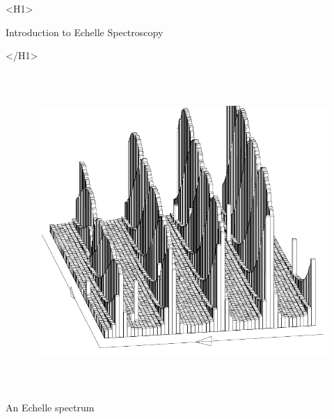 \documentclass[twoside,11pt]{article}
\newcommand{\stardoctitle}     {Introduction to Echelle Spectroscopy}
\newcommand{\stardocversion}   {[software-version]}
\newcommand{\stardocmanual}    {[manual-type]}
\newcommand{\xlabel}[1]{}
\begin{document}
\begin{htmlonly}
   \xlabel{}
   \begin{rawhtml} <H1> \end{rawhtml}
      \stardoctitle\\
   \begin{rawhtml} </H1> \end{rawhtml}

   \begin{figure}[h]
   \includegraphics[height=120mm]{sg9_cover}
   \end{figure}

   \begin{center}
   An Echelle spectrum
   \end{center}



\end{htmlonly}
\end{document}
